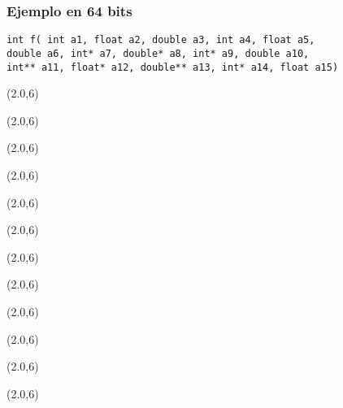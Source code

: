 \documentclass[aspectratio=169]{beamer}
\begin{document}
\begin{frame}[t,fragile]
\frametitle{Ejemplo en 64 bits}
\begin{verbatim}
int f( int a1, float a2, double a3, int a4, float a5,
double a6, int* a7, double* a8, int* a9, double a10,
int** a11, float* a12, double** a13, int* a14, float a15)
\end{verbatim}
    \begin{textblock}{20}(2.0,6)  \end{textblock}
    \begin{textblock}{20}(2.0,6)  \end{textblock}
    \begin{textblock}{20}(2.0,6)  \end{textblock}
    \begin{textblock}{20}(2.0,6)  \end{textblock}
    \begin{textblock}{20}(2.0,6)  \end{textblock}
    \begin{textblock}{20}(2.0,6)  \end{textblock}
    \begin{textblock}{20}(2.0,6)  \end{textblock}
    \begin{textblock}{20}(2.0,6)  \end{textblock}
    \begin{textblock}{20}(2.0,6)  \end{textblock}
    \begin{textblock}{20}(2.0,6)  \end{textblock}
    \begin{textblock}{20}(2.0,6)  \end{textblock}
    \begin{textblock}{20}(2.0,6)  \end{textblock}

\end{frame}
\end{document}
